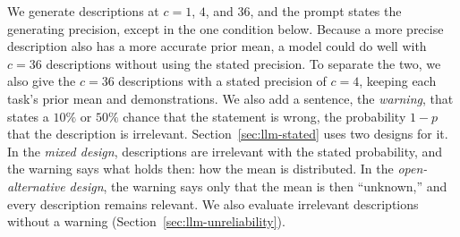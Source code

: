 We generate descriptions at $c=1$, $4$, and $36$, and the prompt states the generating precision, except in the one condition below. Because a more precise description also has a more accurate prior mean, a model could do well with $c=36$ descriptions without using the stated precision. To separate the two, we also give the $c=36$ descriptions with a stated precision of $c=4$, keeping each task's prior mean and demonstrations. We also add a sentence, the \emph{warning}, that states a $10\%$ or $50\%$ chance that the statement is wrong, the probability $1-p$ that the description is irrelevant. Section~\ref{sec:llm-stated} uses two designs for it. In the \emph{mixed design}, descriptions are irrelevant with the stated probability, and the warning says what holds then: how the mean is distributed. In the \emph{open-alternative design}, the warning says only that the mean is then ``unknown,'' and every description remains relevant. We also evaluate irrelevant descriptions without a warning (Section~\ref{sec:llm-unreliability}).

